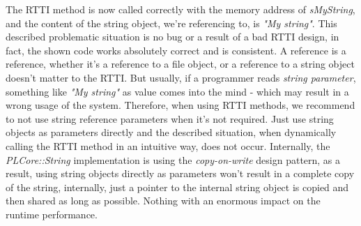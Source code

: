 The \ac{RTTI} method is now called correctly with the memory address of \emph{sMyString}, and the content of the string object, we're referencing to, is \emph{"My string"}. This described problematic situation is no bug or a result of a bad \ac{RTTI} design, in fact, the shown code works absolutely correct and is consistent. A reference is a reference, whether it's a reference to a file object, or a reference to a string object doesn't matter to the \ac{RTTI}. But usually, if a programmer reads \emph{string parameter}, something like \emph{"My string"} as value comes into the mind - which may result in a wrong usage of the system. Therefore, when using \ac{RTTI} methods, we recommend to not use string reference parameters when it's not required. Just use string objects as parameters directly and the described situation, when dynamically calling the \ac{RTTI} method in an intuitive way, does not occur. Internally, the \emph{PLCore::String} implementation is using the \emph{copy-on-write} design pattern, as a result, using string objects directly as parameters won't result in a complete copy of the string, internally, just a pointer to the internal string object is copied and then shared as long as possible. Nothing with an enormous impact on the runtime performance.
